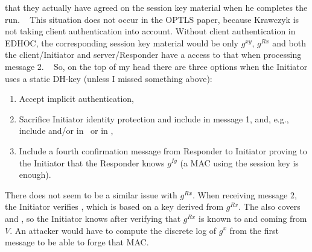 that they actually have agreed on the session key material when he completes
the run.
%
 
This situation does not occur in the OPTLS paper, because Krawczyk is not
taking client authentication into account.
%
Without client authentication in EDHOC, the corresponding session key material
would be only $g^{xy}$, $g^{Rx}$ and both the client/Initiator and
server/Responder have a access to that when processing message 2.
%
 
So, on the top of my head there are three options when the Initiator uses a
static DH-key (unless I missed something above):
\begin{enumerate}
    \item Accept implicit authentication,
    \item Sacrifice Initiator identity protection and include
         in message 1, and, e.g., include
         and/or 
        in  or in ,
    \item Include a fourth confirmation message from Responder to Initiator
        proving to the Initiator that the Responder knows $g^{Iy}$ (a MAC using
        the session key is enough).
\end{enumerate}
% 
There does not seem to be a similar issue with $g^{Rx}$.
%
When receiving message 2, the Initiator verifies , which is
based on a key derived from $g^{Rx}$.
%
The  also covers  and
, so the Initiator knows after verifying
 that $g^{Rx}$ is known to and coming from $V$.
%
An attacker would have to compute the discrete log of $g^{x}$ from the first
message to be able to forge that MAC.
% 

